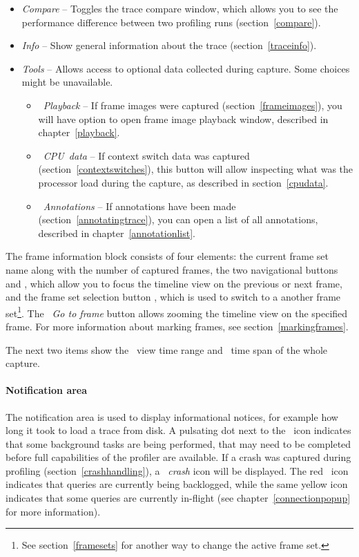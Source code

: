 \documentclass[hidelinks,titlepage,a4paper]{article}
\begin{document}
\begin{itemize}
\item \emph{\faBalanceScale{} Compare} -- Toggles the trace compare window, which allows you to see the performance difference between two profiling runs (section~\ref{compare}).
\item \emph{\faFingerprint{} Info} -- Show general information about the trace (section~\ref{traceinfo}).
\item \emph{\faTools{} Tools} -- Allows access to optional data collected during capture. Some choices might be unavailable.
\begin{itemize}
\item \emph{\faPlay{}~Playback} -- If frame images were captured (section~\ref{frameimages}), you will have option to open frame image playback window, described in chapter~\ref{playback}.
\item \emph{\faSlidersH{}~CPU~data} -- If context switch data was captured (section~\ref{contextswitches}), this button will allow inspecting what was the processor load during the capture, as described in section~\ref{cpudata}.
\item \emph{\faStickyNote{}~Annotations} -- If annotations have been made (section~\ref{annotatingtrace}), you can open a list of all annotations, described in chapter~\ref{annotationlist}.
\end{itemize}
\end{itemize}

The frame information block consists of four elements: the current frame set name along with the number of captured frames, the two navigational buttons \faCaretLeft{} and \faCaretRight{}, which allow you to focus the timeline view on the previous or next frame, and the frame set selection button \faCaretDown{}, which is used to switch to a another frame set\footnote{See section~\ref{framesets} for another way to change the active frame set.}. The \emph{\faCrosshairs{}~Go to frame} button allows zooming the timeline view on the specified frame. For more information about marking frames, see section~\ref{markingframes}.

The next two items show the \faEye{}~view time range and \faDatabase{}~time span of the whole capture.

\paragraph{Notification area}

The notification area is used to display informational notices, for example how long it took to load a trace from disk. A pulsating dot next to the \faTasks~icon indicates that some background tasks are being performed, that may need to be completed before full capabilities of the profiler are available. If a crash was captured during profiling (section~\ref{crashhandling}), a \emph{\faSkull{}~crash} icon will be displayed. The red \faTachometer*{}~icon indicates that queries are currently being backlogged, while the same yellow icon indicates that some queries are currently in-flight (see chapter~\ref{connectionpopup} for more information).
\end{document}
